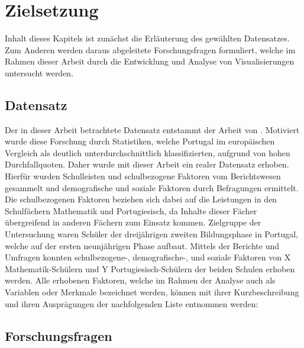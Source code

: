 \chapter[Zielsetzung]{Zielsetzung}

Inhalt dieses Kapitels ist zunächst die Erläuterung des gewählten Datensatzes.
Zum Anderen werden daraus abgeleitete Forschungsfragen formuliert, welche im Rahmen dieser Arbeit durch die Entwicklung und Analyse von Visualisierungen untersucht werden. 

\section[Untersuchter Datensatz]{Datensatz}

Der in dieser Arbeit betrachtete Datensatz entstammt der Arbeit von \cite[]{Cortez2008UsingDM}.
Motiviert wurde diese Forschung durch Statistiken, welche Portugal im europäischen Vergleich als deutlich unterdurchschnittlich klassifizierten, aufgrund von hohen Durchfallquoten. \cite[S. 1]{Cortez2008UsingDM}
Daher wurde mit dieser Arbeit ein realer Datensatz erhoben.
Hierfür wurden Schulleisten und schulbezogene Faktoren vom Berichtswesen gesammelt und demografische und soziale Faktoren durch Befragungen ermittelt. \cite[S. 1]{Cortez2008UsingDM}
Die schulbezogenen Faktoren beziehen sich dabei auf die Leistungen in den Schulfächern Mathematik und Portugiesisch, da Inhalte dieser Fächer übergreifend in anderen Fächern zum Einsatz kommen. \cite[S. 2]{Cortez2008UsingDM}
Zielgruppe der Untersuchung waren Schüler der dreijährigen zweiten Bildungsphase in Portugal, welche auf der ersten neunjährigen Phase aufbaut. \cite[S. 2]{Cortez2008UsingDM}
Mittels der Berichte und Umfragen konnten schulbezogene-, demografische-, und soziale Faktoren von X Mathematik-Schülern und Y Portugiesisch-Schülern der beiden Schulen erhoben werden.
Alle erhobenen Faktoren, welche im Rahmen der Analyse auch als Variablen oder Merkmale bezeichnet werden, können mit ihrer Kurzbeschreibung und ihren Ausprägungen der nachfolgenden Liste entnommen werden:



\section[Forschungsfragen]{Forschungsfragen}